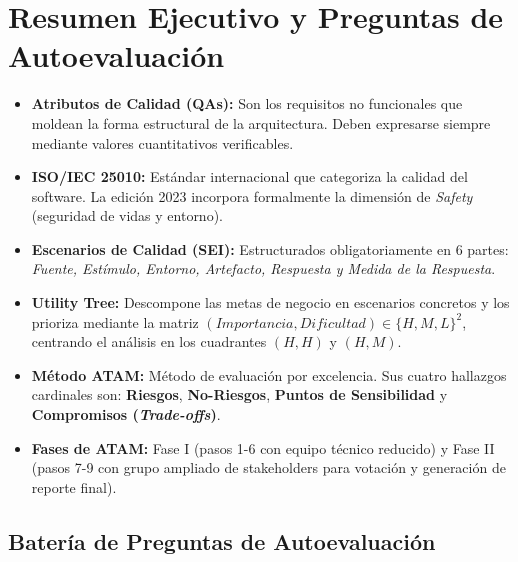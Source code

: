\section{Resumen Ejecutivo y Preguntas de Autoevaluación}
\label{sec:resumen-tema4}

\begin{tcolorbox}[
  enhanced,
  colback=secondary!5!bglight,
  colframe=secondary,
  arc=3mm,
  boxrule=1pt,
  title={\bfseries\color{white} Resumen de Conceptos Clave del Tema 4},
  coltitle=white
]
\begin{itemize}[leftmargin=1.5em]
  \item \textbf{Atributos de Calidad (QAs):} Son los requisitos no funcionales que moldean la forma estructural de la arquitectura. Deben expresarse siempre mediante valores cuantitativos verificables.
  \item \textbf{ISO/IEC 25010:} Estándar internacional que categoriza la calidad del software. La edición 2023 incorpora formalmente la dimensión de \emph{Safety} (seguridad de vidas y entorno).
  \item \textbf{Escenarios de Calidad (SEI):} Estructurados obligatoriamente en 6 partes: \emph{Fuente, Estímulo, Entorno, Artefacto, Respuesta y Medida de la Respuesta}.
  \item \textbf{Utility Tree:} Descompone las metas de negocio en escenarios concretos y los prioriza mediante la matriz $(Importancia, Dificultad) \in \{H, M, L\}^2$, centrando el análisis en los cuadrantes $(H, H)$ y $(H, M)$.
  \item \textbf{Método ATAM:} Método de evaluación por excelencia. Sus cuatro hallazgos cardinales son: \textbf{Riesgos}, \textbf{No-Riesgos}, \textbf{Puntos de Sensibilidad} y \textbf{Compromisos (\emph{Trade-offs})}.
  \item \textbf{Fases de ATAM:} Fase I (pasos 1-6 con equipo técnico reducido) y Fase II (pasos 7-9 con grupo ampliado de stakeholders para votación y generación de reporte final).
\end{itemize}
\end{tcolorbox}

\subsection{Batería de Preguntas de Autoevaluación}

